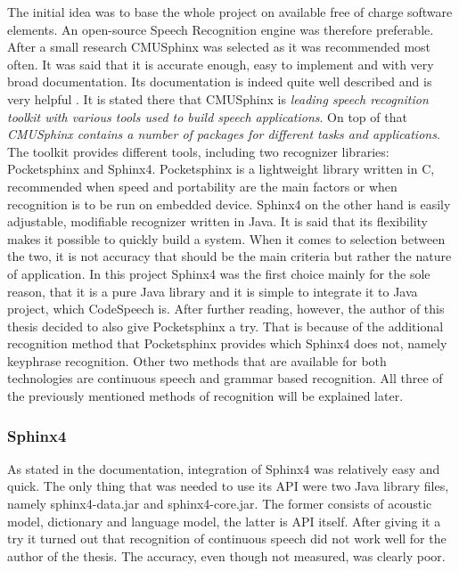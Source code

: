 The initial idea was to base the whole project on available free of charge software elements. An open-source Speech Recognition engine was therefore preferable. After a small research CMUSphinx was selected as it was recommended most often. It was said that it is accurate enough, easy to implement and with very broad documentation. Its documentation is indeed quite well described and is very helpful \cite{CMUSphinx}. It is stated there that CMUSphinx is \textit{leading speech recognition toolkit with various tools used to build speech applications}. On top of that \textit{CMUSphinx contains a number of packages for different tasks and applications}. The toolkit provides different tools, including two recognizer libraries: Pocketsphinx and Sphinx4. Pocketsphinx is a lightweight library written in C, recommended when speed and portability are the main factors or when recognition is to be run on embedded device. Sphinx4 on the other hand is easily adjustable, modifiable recognizer written in Java. It is said that its flexibility makes it possible to quickly build a system. When it comes to selection between the two, it is not accuracy that should be the main criteria but rather the nature of application. In this project Sphinx4 was the first choice mainly for the sole reason, that it is a pure Java library and it is simple to integrate it to Java project, which CodeSpeech is. After further reading, however, the author of this thesis decided to also give Pocketsphinx a try. That is because of the additional recognition method that Pocketsphinx provides which Sphinx4 does not, namely keyphrase recognition. Other two methods that are available for both technologies are continuous speech and grammar based recognition. All three of the previously mentioned methods of recognition will be explained later.


\subsubsection{Sphinx4}

As stated in the documentation, integration of Sphinx4 was relatively easy and quick. The only thing that was needed to use its API were two Java library files, namely sphinx4-data.jar and sphinx4-core.jar. The former consists of acoustic model, dictionary and language model, the latter is API itself. After giving it a try it turned out that recognition of continuous speech did not work well for the author of the thesis. The accuracy, even though not measured, was clearly poor. 

